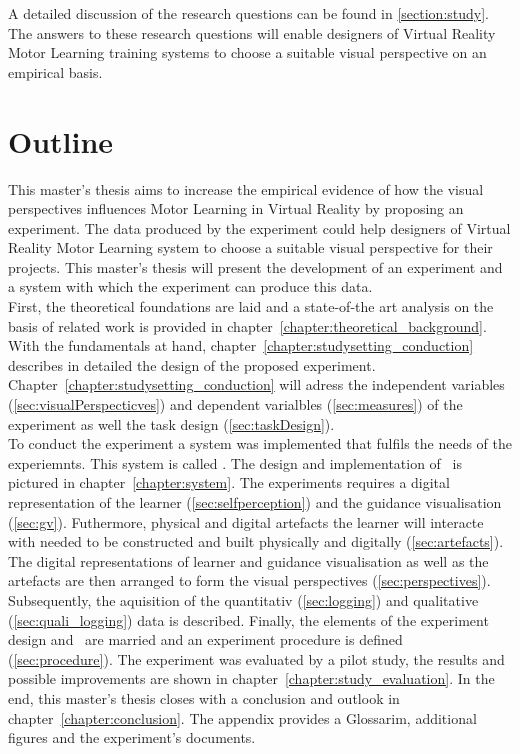 A detailed discussion of the research questions can be found in \ref{section:study}.\\
The answers to these research questions will enable designers of Virtual Reality Motor Learning training systems to choose a suitable visual perspective on an empirical basis.

\section{Outline}
This master's thesis aims to increase the empirical evidence of how the visual perspectives influences Motor Learning in Virtual Reality by proposing an experiment. The data produced by the experiment could help designers of Virtual Reality Motor Learning system to choose a suitable visual perspective for their projects. This master's thesis will present the development of an experiment and a system with which the experiment can produce this data.\\
First, the theoretical foundations are laid and a state-of-the art analysis on the basis of related work is provided in chapter~\ref{chapter:theoretical_background}. With the fundamentals at hand, chapter~\ref{chapter:studysetting_conduction} describes in detailed the design of the proposed experiment. Chapter~\ref{chapter:studysetting_conduction} will adress the independent variables (\ref{sec:visualPerspecticves}) and dependent varialbles (\ref{sec:measures}) of the experiment as well the task design (\ref{sec:taskDesign}).\\
To conduct the experiment a system was implemented that fulfils the needs of the experiemnts. This system is called \exgo. The design and implementation of \exgo\ is pictured in chapter~\ref{chapter:system}. The experiments requires a digital representation of the learner (\ref{sec:selfperception}) and the guidance visualisation (\ref{sec:gv}). Futhermore, physical and digital artefacts the learner will interacte with needed to be constructed and built physically and digitally (\ref{sec:artefacts}). The digital representations of learner and guidance visualisation as well as the artefacts are then arranged to form the visual perspectives (\ref{sec:perspectives}). Subsequently, the aquisition of the quantitativ (\ref{sec:logging}) and qualitative (\ref{sec:quali_logging}) data is described. Finally, the elements of the experiment design and \exgo\ are married and an experiment procedure is defined (\ref{sec:procedure}). The experiment was evaluated by a pilot study, the results and possible improvements are shown in chapter~\ref{chapter:study_evaluation}. In the end, this master's thesis closes with a conclusion and outlook in chapter~\ref{chapter:conclusion}. The appendix provides a Glossarim, additional figures and the experiment's documents.



